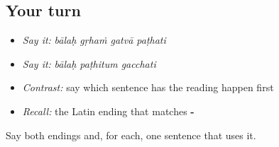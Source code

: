 \subsection*{Your turn}
\begin{itemize}
\raggedright
  \item \emph{Say it:} \emph{bālaḥ gṛhaṁ gatvā paṭhati}
  \item \emph{Say it:} \emph{bālaḥ paṭhitum gacchati}
  \item \emph{Contrast:} say which sentence has the reading happen first
  \item \emph{Recall:} the Latin ending that matches \textbf{-}
\end{itemize}

\begin{tcolorbox}[breakable,colback=teal!4,colframe=teal!35!black,title={Before you move on}]
Say both endings and, for each, one sentence that uses it.
\end{tcolorbox}
